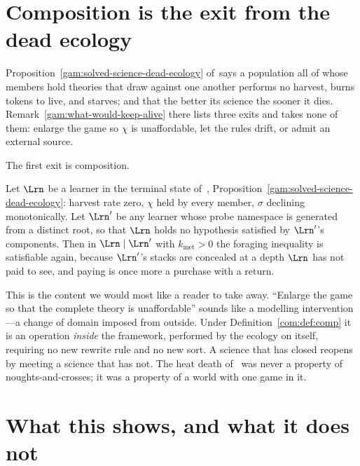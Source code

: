 \section{Composition is the exit from the dead ecology}\label{com:S13}

Proposition~\ref{gam:solved-science-dead-ecology} of~\chGame says a population all of whose members hold theories that draw
against one another performs no harvest, burns tokens to live, and starves; and that the better
its science the sooner it dies. Remark~\ref{gam:what-would-keep-alive} there lists three exits and takes none of them: enlarge
the game so $\chi$ is unaffordable, let the rules drift, or admit an external source.

The first exit is composition.

\begin{proposition}\label{com:composition-restores-harvest}
Let $\Lrn$ be a learner in the terminal state of~\chGame, Proposition~\ref{gam:solved-science-dead-ecology}: harvest rate zero,
$\chi$ held by every member, $\sigma$ declining monotonically. Let $\Lrn'$ be any learner whose
probe namespace is generated from a distinct root, so that $\Lrn$ holds no hypothesis satisfied
by $\Lrn'$'s components. Then in $\Lrn \mid \Lrn'$ with $k_{\mathrm{met}} > 0$ the foraging
inequality is satisfiable again, because $\Lrn'$'s stacks are concealed at a depth $\Lrn$ has not
paid to see, and paying is once more a purchase with a return.
\end{proposition}

\begin{remark}\label{com:enlarging-game-composing-same}
This is the content we would most like a reader to take away. ``Enlarge the game so that the
complete theory is unaffordable'' sounds like a modelling intervention---a change of domain
imposed from outside. Under Definition~\ref{com:def:comp} it is an operation \emph{inside} the
framework, performed by the ecology on itself, requiring no new rewrite rule and no new sort. A
science that has closed reopens by meeting a science that has not. The heat death of~\chGame
was never a property of noughts-and-crosses; it was a property of a world with one game in it.
\end{remark}

\section{What this shows, and what it does not}\label{com:sec:notshown}\label{com:S14}

